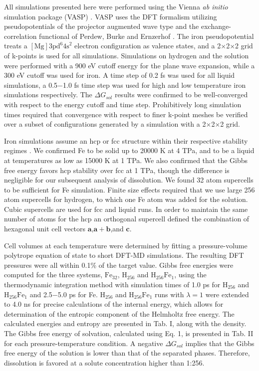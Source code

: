 All simulations presented here were performed using the Vienna {\it ab initio}
simulation package (VASP) \citep{kresse96}. VASP uses the DFT formalism utilizing
pseudopotentials of the projector augmented wave type \citep{blochl94} and the exchange-correlation
functional of Perdew, Burke and Ernzerhof \citep{perdew96}. The iron
pseudopotential treats a $[\mathrm{Mg}]\mathrm{3pd}^6\mathrm{4s}^2$ electron
configuration as valence states, and a 2$\times$2$\times$2
grid of k-points is used for all simulations. Simulations on hydrogen 
and the solution were performed with a 900 eV cutoff energy for the plane wave expansion, while a 300
eV cutoff was used for iron. A time step of 0.2 fs was used for all liquid simulations, a
0.5$-$1.0 fs time step  was used for high and low temperature iron simulations 
respectively. The $\Delta G_{sol}$ results were confirmed to be well-converged
with respect to the energy cutoff and time step. 
Prohibitively long simulation times required that convergence with respect to
finer k-point meshes be verified over a subset of configurations generated by
a simulation with a 2$\times$2$\times$2 grid.

Iron simulations assume an hcp or fcc structure within their respective
stability regimes \citep{pickard09,stixrude12}. We confirmed Fe to be solid up
to 20000 K at 4 TPa, and to be a liquid at temperatures as low as 15000 K at
1 TPa. We also confirmed that the Gibbs free energy favors hcp stability over fcc
at 1 TPa, though the difference is negligible for our subsequent analysis of
dissolution. We found 32 atom supercells to be sufficient for Fe simulation.
Finite size effects required that we use large 256 atom supercells for
hydrogen, to which one Fe atom was added for the solution. Cubic
supercells are used for fcc and liquid runs. In order to maintain the same
number of atoms for the hcp an orthogonal supercell defined the combination of
hexagonal unit cell vectors $\mathbf{a}$,$\mathbf{a}+\mathbf{b}$,and
$\mathbf{c}$.

Cell volumes at each temperature were determined by fitting a pressure-volume polytrope equation of
state to short DFT-MD simulations. The resulting DFT pressures were all within
0.1\% of the target value. Gibbs free energies were computed for the three 
systems, $\mathrm{Fe}_{32}$, $\mathrm{H}_{256}$
and $\mathrm{H}_{256}\mathrm{Fe}_1$, using the thermodynamic integration method with simulation 
times of 1.0 ps for $\mathrm{H}_{256}$ and $\mathrm{H}_{256}\mathrm{Fe}_1$ 
and 2.5$-$5.0 ps for Fe. $\mathrm{H}_{256}$ and $\mathrm{H}_{256}\mathrm{Fe}_1$
runs with
$\lambda =1$ were extended to 4.0 ns for precise calculations of the internal energy,
which allows for determination of the entropic component of the Helmholtz free
energy. The calculated energies and entropy are presented in Tab. I,
along with the density.
The Gibbs free energy of solvation, calculated using Eq. 1, is presented in
Tab. II for each pressure-temperature condition. A negative $\Delta G_{sol}$
implies that the Gibbs free energy of the solution is lower than that of the separated
phases. Therefore, dissolution is favored at a solute concentration
higher than 1:256. 

